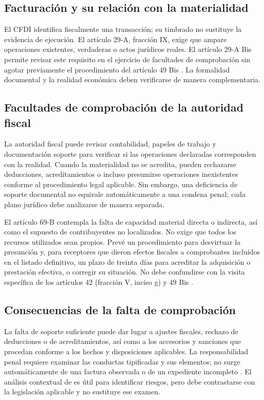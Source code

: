 \documentclass[spanish,12pt,letterpaper,oneside]{article}
\begin{document}
\subsection{Facturación y su relación con la materialidad}
El CFDI identifica fiscalmente una transacción; su timbrado no sustituye la evidencia de ejecución. El artículo 29-A, fracción IX, exige que ampare operaciones existentes, verdaderas o actos jurídicos reales. El artículo 29-A Bis permite revisar este requisito en el ejercicio de facultades de comprobación sin agotar previamente el procedimiento del artículo 49 Bis \parencite[arts. 29-A y 29-A Bis]{cff2026}. La formalidad documental y la realidad económica deben verificarse de manera complementaria.

\subsection{Facultades de comprobación de la autoridad fiscal}
La autoridad fiscal puede revisar contabilidad, papeles de trabajo y documentación soporte para verificar si las operaciones declaradas corresponden con la realidad. Cuando la materialidad no se acredita, pueden rechazarse deducciones, acreditamientos o incluso presumirse operaciones inexistentes conforme al procedimiento legal aplicable. Sin embargo, una deficiencia de soporte documental no equivale automáticamente a una condena penal; cada plano jurídico debe analizarse de manera separada.

El artículo 69-B contempla la falta de capacidad material directa o indirecta, así como el supuesto de contribuyentes no localizados. No exige que todos los recursos utilizados sean propios. Prevé un procedimiento para desvirtuar la presunción y, para receptores que dieron efectos fiscales a comprobantes incluidos en el listado definitivo, un plazo de treinta días para acreditar la adquisición o prestación efectiva, o corregir su situación. No debe confundirse con la visita específica de los artículos 42 (fracción V, inciso g) y 49 Bis \parencite[arts. 42, 49 Bis y 69-B]{cff2026}.

\subsection{Consecuencias de la falta de comprobación}
La falta de soporte suficiente puede dar lugar a ajustes fiscales, rechazo de deducciones o de acreditamientos, así como a los accesorios y sanciones que procedan conforme a los hechos y disposiciones aplicables. La responsabilidad penal requiere examinar las conductas tipificadas y sus elementos; no surge automáticamente de una factura observada o de un expediente incompleto \parencite[arts. 69-B, 108 y 113 Bis]{cff2026}. El análisis contextual de \textcite{rico2024consecuencias} es útil para identificar riesgos, pero debe contrastarse con la legislación aplicable y no sustituye ese examen.
\end{document}

